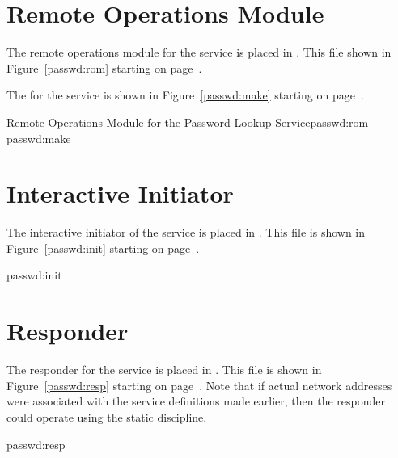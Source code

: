 \section	{Remote Operations Module}
The remote operations module for the service is placed in .
This file shown in Figure~\ref{passwd:rom} starting on
page~\pageref{passwd:rom}.

The  for the service is shown in Figure~\ref{passwd:make}
starting on page~\pageref{passwd:make}.

\newpage
{}%
	{Remote Operations Module for the Password Lookup Service}{passwd:rom}
\newpage
{}%
	{passwd:make}
\newpage

\section	{Interactive Initiator}\label{passwd:initiator}
The interactive initiator of the service is placed in .
This file is shown in Figure~\ref{passwd:init} starting on
page~\pageref{passwd:init}.

%
	{passwd:init}
\newpage

\section	{Responder}\label{passwd:responder}
The responder for the service is placed in .
This file is shown in Figure~\ref{passwd:resp} starting on
page~\pageref{passwd:resp}.
Note that if actual network addresses were associated with the service
definitions made earlier,
then the responder could operate using the static discipline.

%
	{passwd:resp}
